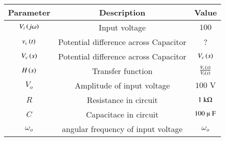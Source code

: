 \begin{tabular}{|c|c|c|}
    \hline
    \textbf{Parameter} & \textbf{Description} & \textbf{Value} \\
    \hline
    $V_i\left(j\omega\right)$ & Input voltage & $ 100$\\
    \hline
    $v_c\left(t\right)$ & Potential difference across Capacitor & ? \\
    \hline
    $V_c\left(s\right)$ & Potential difference across Capacitor & $V_c\left(s\right)$ \\
    \hline
    $H\left(s\right)$ & Transfer function & $ \frac{V_c\left(s\right)}{V_i\left(s\right)}$ \\
    \hline
    $ V_o$ & Amplitude of input voltage & $ 100 \text{ V}$\\
    \hline
    $R$ & Resistance in circuit & $ 1\text{ k\ohm}$ \\
    \hline
    $C$ & Capacitace in circuit & $ 100 \text{ $ \micro$ F}$ \\
    \hline
    $\omega_o$ & angular frequency of input voltage& $ \omega_o$\\
    \hline
\end{tabular}



